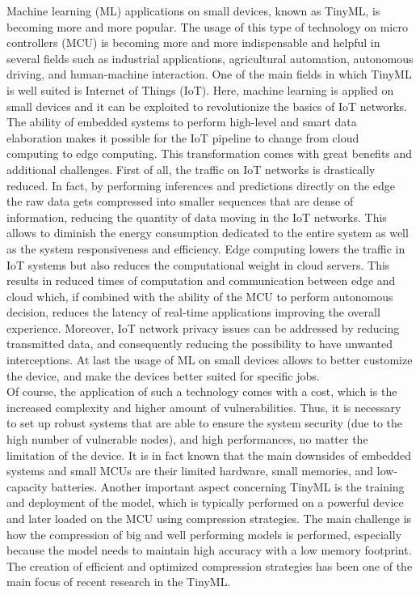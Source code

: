 \documentclass[12pt]{report}
\begin{document}
\label{intro}
Machine learning (ML) applications on small devices, known as TinyML, is becoming more and more popular. The usage of this type of technology on micro controllers (MCU) is becoming more and more indispensable and helpful in several fields such as industrial applications, agricultural automation, autonomous driving, and human-machine interaction. One of the main fields in which TinyML is well suited is Internet of Things (IoT). Here, machine learning is applied on small devices and it can be exploited to revolutionize the basics of IoT networks.\\
The ability of embedded systems to perform high-level and smart data elaboration makes it possible for the IoT pipeline to change from cloud computing to edge computing. This transformation comes with great benefits and additional challenges.
First of all, the traffic on IoT networks is drastically reduced. In fact, by performing inferences and predictions directly on the edge the raw data gets compressed into smaller sequences that are dense of information, reducing the quantity of data moving in the IoT networks. This allows to diminish the energy consumption dedicated to the entire system as well as the system responsiveness and efficiency.
Edge computing lowers the traffic in IoT systems but also reduces the computational weight in cloud servers. This results in reduced times of computation and communication between edge and cloud which, if combined with the ability of the MCU to perform autonomous decision, reduces the latency of real-time applications improving the overall experience.
Moreover, IoT network privacy issues can be addressed by reducing transmitted data, and consequently reducing the possibility to have unwanted interceptions.
At last the usage of ML on small devices allows to better customize the device, and make the devices better suited for specific jobs. \\
Of course, the application of such a technology comes with a cost, which is the increased complexity and higher amount of vulnerabilities. Thus, it is necessary to set up robust systems that are able to ensure the system security (due to the high number of vulnerable nodes), and high performances, no matter the limitation of the device. It is in fact known that the main downsides of embedded systems and small MCUs are their limited hardware, small memories, and low-capacity batteries. Another important aspect concerning TinyML is the training and deployment of the model, which is typically performed on a powerful device and later loaded on the MCU using compression strategies. The main challenge is how the compression of big and well performing models is performed, especially because the model needs to maintain high accuracy with a low memory footprint. The creation of efficient and optimized compression strategies has been one of the main focus of recent research in the TinyML. \\
\end{document}
